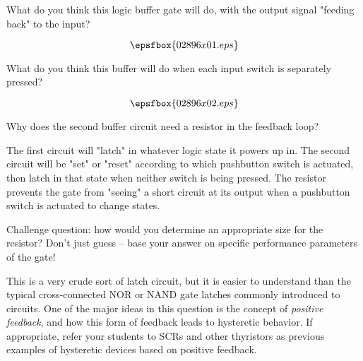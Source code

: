 

What do you think this logic buffer gate will do, with the output signal "feeding back" to the input?

$$\epsfbox{02896x01.eps}$$

What do you think this buffer will do when each input switch is separately pressed?

$$\epsfbox{02896x02.eps}$$

Why does the second buffer circuit need a resistor in the feedback loop?







The first circuit will "latch" in whatever logic state it powers up in.  The second circuit will be "set" or "reset" according to which pushbutton switch is actuated, then latch in that state when neither switch is being pressed.  The resistor prevents the gate from "seeing" a short circuit at its output when a pushbutton switch is actuated to change states.

\vskip 10pt

Challenge question: how would you determine an appropriate size for the resistor?  Don't just guess -- base your answer on specific performance parameters of the gate!







This is a very crude sort of latch circuit, but it is easier to understand than the typical cross-connected NOR or NAND gate latches commonly introduced to circuits.  One of the major ideas in this question is the concept of {\it positive feedback}, and how this form of feedback leads to hysteretic behavior.  If appropriate, refer your students to SCRs and other thyristors as previous examples of hysteretic devices based on positive feedback.




